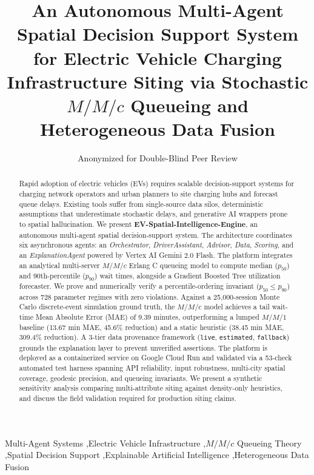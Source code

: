 \documentclass[preprint,12pt,authoryear]{elsarticle}
\begin{document}
\begin{frontmatter}

\title{An Autonomous Multi-Agent Spatial Decision Support System for Electric Vehicle Charging Infrastructure Siting via Stochastic $M/M/c$ Queueing and Heterogeneous Data Fusion}

\author{Anonymized for Double-Blind Peer Review}

\begin{abstract}
Rapid adoption of electric vehicles (EVs) requires scalable decision-support systems for charging network operators and urban planners to site charging hubs and forecast queue delays. Existing tools suffer from single-source data silos, deterministic assumptions that underestimate stochastic delays, and generative AI wrappers prone to spatial hallucination. We present \textbf{EV-Spatial-Intelligence-Engine}, an autonomous multi-agent spatial decision-support system. The architecture coordinates six asynchronous agents: an \textit{Orchestrator}, \textit{DriverAssistant}, \textit{Advisor}, \textit{Data}, \textit{Scoring}, and an \textit{ExplanationAgent} powered by Vertex AI Gemini 2.0 Flash. The platform integrates an analytical multi-server $M/M/c$ Erlang C queueing model to compute median ($p_{50}$) and 90th-percentile ($p_{90}$) wait times, alongside a Gradient Boosted Tree utilization forecaster. We prove and numerically verify a percentile-ordering invariant ($p_{50} \le p_{90}$) across 728 parameter regimes with zero violations. Against a 25{,}000-session Monte Carlo discrete-event simulation ground truth, the $M/M/c$ model achieves a tail wait-time Mean Absolute Error (MAE) of 9.39 minutes, outperforming a lumped $M/M/1$ baseline (13.67 min MAE, 45.6\% reduction) and a static heuristic (38.45 min MAE, 309.4\% reduction). A 3-tier data provenance framework (\texttt{live}, \texttt{estimated}, \texttt{fallback}) grounds the explanation layer to prevent unverified assertions. The platform is deployed as a containerized service on Google Cloud Run and validated via a 53-check automated test harness spanning API reliability, input robustness, multi-city spatial coverage, geodesic precision, and queueing invariants. We present a synthetic sensitivity analysis comparing multi-attribute siting against density-only heuristics, and discuss the field validation required for production siting claims.
\end{abstract}

\begin{keyword}
Multi-Agent Systems \sep Electric Vehicle Infrastructure \sep $M/M/c$ Queueing Theory \sep Spatial Decision Support \sep Explainable Artificial Intelligence \sep Heterogeneous Data Fusion
\end{keyword}

\end{frontmatter}
\end{document}
